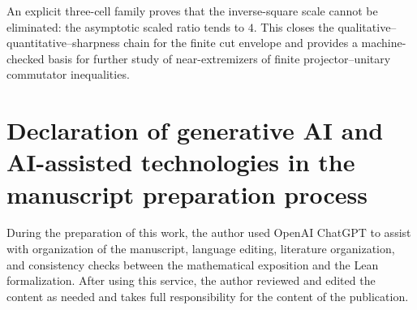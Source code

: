 \documentclass[11pt]{article}
\begin{document}
An explicit three-cell family proves that the inverse-square scale cannot be
eliminated: the asymptotic scaled ratio tends to $4$.  This closes the
qualitative--quantitative--sharpness chain for the finite cut envelope and
provides a machine-checked basis for further study of near-extremizers of
finite projector--unitary commutator inequalities.

\section*{Declaration of generative AI and AI-assisted technologies in the manuscript preparation process}

During the preparation of this work, the author used OpenAI ChatGPT to assist
with organization of the manuscript, language editing, literature
organization, and consistency checks between the mathematical exposition and
the Lean formalization. After using this service, the author reviewed and
edited the content as needed and takes full responsibility for the content of
the publication.



\end{document}
